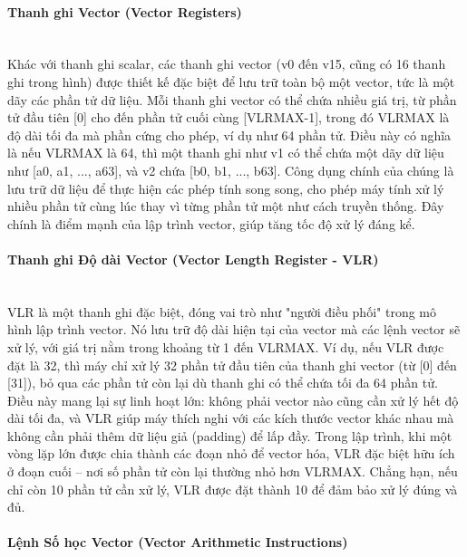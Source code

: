 \documentclass[a4paper]{article}
\begin{document}
\paragraph{Thanh ghi Vector (Vector Registers)}\leavevmode\\

Khác với thanh ghi scalar, các thanh ghi vector (v0 đến v15, cũng có 16 thanh ghi trong hình) được thiết kế đặc biệt để lưu trữ toàn bộ một vector, tức là một dãy các phần tử dữ liệu. Mỗi thanh ghi vector có thể chứa nhiều giá trị, từ phần tử đầu tiên [0] cho đến phần tử cuối cùng [VLRMAX-1], trong đó VLRMAX là độ dài tối đa mà phần cứng cho phép, ví dụ như 64 phần tử. Điều này có nghĩa là nếu VLRMAX là 64, thì một thanh ghi như v1 có thể chứa một dãy dữ liệu như [a0, a1, ..., a63], và v2 chứa [b0, b1, ..., b63]. Công dụng chính của chúng là lưu trữ dữ liệu để thực hiện các phép tính song song, cho phép máy tính xử lý nhiều phần tử cùng lúc thay vì từng phần tử một như cách truyền thống. Đây chính là điểm mạnh của lập trình vector, giúp tăng tốc độ xử lý đáng kể.

\paragraph{Thanh ghi Độ dài Vector (Vector Length Register - VLR)}\leavevmode\\

VLR là một thanh ghi đặc biệt, đóng vai trò như "người điều phối" trong mô hình lập trình vector. Nó lưu trữ độ dài hiện tại của vector mà các lệnh vector sẽ xử lý, với giá trị nằm trong khoảng từ 1 đến VLRMAX. Ví dụ, nếu VLR được đặt là 32, thì máy chỉ xử lý 32 phần tử đầu tiên của thanh ghi vector (từ [0] đến [31]), bỏ qua các phần tử còn lại dù thanh ghi có thể chứa tối đa 64 phần tử. Điều này mang lại sự linh hoạt lớn: không phải vector nào cũng cần xử lý hết độ dài tối đa, và VLR giúp máy thích nghi với các kích thước vector khác nhau mà không cần phải thêm dữ liệu giả (padding) để lấp đầy. Trong lập trình, khi một vòng lặp lớn được chia thành các đoạn nhỏ để vector hóa, VLR đặc biệt hữu ích ở đoạn cuối – nơi số phần tử còn lại thường nhỏ hơn VLRMAX. Chẳng hạn, nếu chỉ còn 10 phần tử cần xử lý, VLR được đặt thành 10 để đảm bảo xử lý đúng và đủ.

\paragraph{Lệnh Số học Vector (Vector Arithmetic Instructions)}\leavevmode\\
\end{document}

